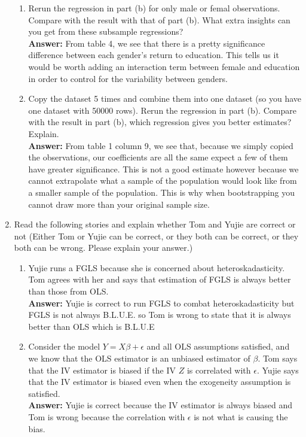 \documentclass[11pt]{SelfArxOneColBMN}
\begin{document}
\begin{enumerate}
\begin{enumerate}[label=(\alph*)]
    \item Rerun the regression in part (b) for only male or femal observations. Compare with the result with that of part (b). What extra insights can you get from these subsample regressions?\\
    \textbf{Answer: }From table 4, we see that there is a pretty significance difference between each gender's return to education. This tells us it would be worth adding an interaction term between female and education in order to control for the variability between genders. 
    \item Copy the dataset 5 times and combine them into one dataset (so you have one dataset with 50000 rows). Rerun the regression in part (b). Compare with the result in part (b), which regression gives you better estimates? Explain.\\
    \textbf{Answer: }From table 1 column 9, we see that, because we simply copied the observations, our coefficients are all the same expect a few of them have greater significance. This is not a good estimate however because we cannot extrapolate what a sample of the population would look like from a smaller sample of the population. This is why when bootstrapping you cannot draw more than your original sample size. 
  \end{enumerate}
  \item Read the following stories and explain whether Tom and Yujie are correct or not (Either Tom or Yujie can be correct, or they both can be correct, or they both can be wrong. Please explain your answer.)
  \begin{enumerate}
    \item Yujie runs a FGLS because she is concerned about heteroskadasticity. Tom agrees with her and says that estimation of FGLS is always better than those from OLS.\\
    \textbf{Answer: }Yujie is correct to run FGLS to combat heteroskadasticity but FGLS is not always B.L.U.E. so Tom is wrong to state that it is always better than OLS which is B.L.U.E
    \item Consider the model $Y = X\beta + \epsilon$ and all OLS assumptions satisfied, and we know that the OLS estimator is an unbiased estimator of $\beta$. Tom says that the IV estimator is biased if the IV $Z$ is correlated with $\epsilon$. Yujie says that the IV estimator is biased even when the exogeneity assumption is satisfied.\\
    \textbf{Answer: }Yujie is correct because the IV estimator is always biased and Tom is wrong because the correlation with $\epsilon$ is not what is causing the bias.

\end{enumerate}
\end{enumerate}
\end{document}
